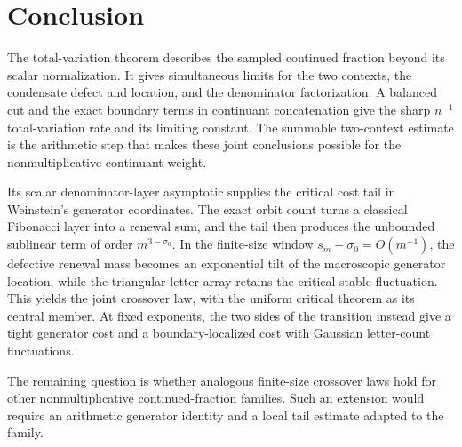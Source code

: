 \section{Conclusion}\label{sec:conclusion}

The total-variation theorem describes the sampled continued fraction beyond
its scalar normalization.  It gives simultaneous limits for the two
contexts, the condensate defect and location, and the denominator
factorization.  A balanced cut and the exact boundary terms in continuant
concatenation give the sharp \(n^{-1}\) total-variation rate and its limiting
constant.  The summable two-context estimate is the arithmetic step that
makes these joint conclusions possible for the nonmultiplicative continuant
weight.

Its scalar denominator-layer asymptotic supplies the critical cost tail in
Weinstein's generator coordinates.  The exact orbit count turns a classical
Fibonacci layer into a renewal sum, and the tail then produces the unbounded
sublinear term of order \(m^{3-\sigma_0}\).  In the finite-size window
\(s_m-\sigma_0=O(m^{-1})\), the defective renewal mass becomes an exponential
tilt of the macroscopic generator location, while the triangular letter
array retains the critical stable fluctuation.  This yields the joint
crossover law, with the uniform critical theorem as its central member.
At fixed exponents, the two sides of the transition instead give a tight
generator cost and a boundary-localized cost with Gaussian letter-count
fluctuations.

The remaining question is whether analogous finite-size crossover laws hold
for other nonmultiplicative continued-fraction families.  Such an extension
would require an arithmetic generator identity and a local tail estimate
adapted to the family.

